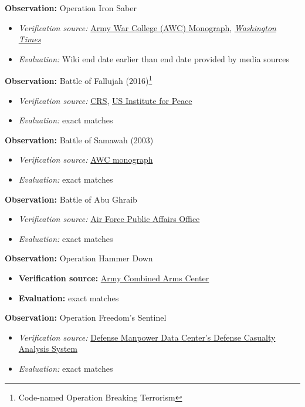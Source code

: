 \documentclass[fleqn,12pt]{article}
\begin{document}
\textbf{Observation:} Operation Iron Saber
\begin{itemize}
    \item \textit{Verification source:} \href{https://www.armyupress.army.mil/Portals/7/military-review/Archives/English/MilitaryReview_20100930ER_art016.pdf}{Army War College (AWC) Monograph}, \href{https://www.washingtontimes.com/news/2004/jun/22/20040622-113720-3352r/}{\textit{Washington Times}}
    \item \textit{Evaluation:} Wiki end date earlier than end date provided by media sources
\end{itemize}

\textbf{Observation:} Battle of Fallujah (2016)\footnote{Code-named Operation Breaking Terrorism}
\begin{itemize}
    \item \textit{Verification source:} \href{https://crsreports.congress.gov/product/pdf/R/R45025/4}{CRS}, \href{https://www.usip.org/iraq-timeline-2003-war}{US Institute for Peace}
    \item \textit{Evaluation:} exact matches
\end{itemize}

\textbf{Observation:} Battle of Samawah (2003)
\begin{itemize}
    \item \textit{Verification source:} \href{https://apps.dtic.mil/sti/pdfs/AD1066345.pdf}{AWC monograph}
    \item \textit{Evaluation:} exact matches
\end{itemize}

\textbf{Observation:} Battle of Abu Ghraib
\begin{itemize}
    \item \textit{Verification source:} \href{https://www.af.mil/News/Article-Display/Article/134452/air-force-medics-treat-patients-at-abu-ghraib/}{Air Force Public Affairs Office}
    \item \textit{Evaluation:} exact matches
\end{itemize}

\textbf{Observation:} Operation Hammer Down
\begin{itemize}
    \item \textbf{Verification source:} \href{http://cacti35th.com/active/HammerDown.pdf}{Army Combined Arms Center}
    \item \textbf{Evaluation:} exact matches
\end{itemize}

\textbf{Observation:} Operation Freedom's Sentinel
\begin{itemize}
    \item \textit{Verification source:} \href{https://dcas.dmdc.osd.mil/dcas/app/conflictCasualties/ofs}{Defense Manpower Data Center's Defense Casualty Analysis System}
    \item \textit{Evaluation:} exact matches
\end{itemize}
\end{document}
